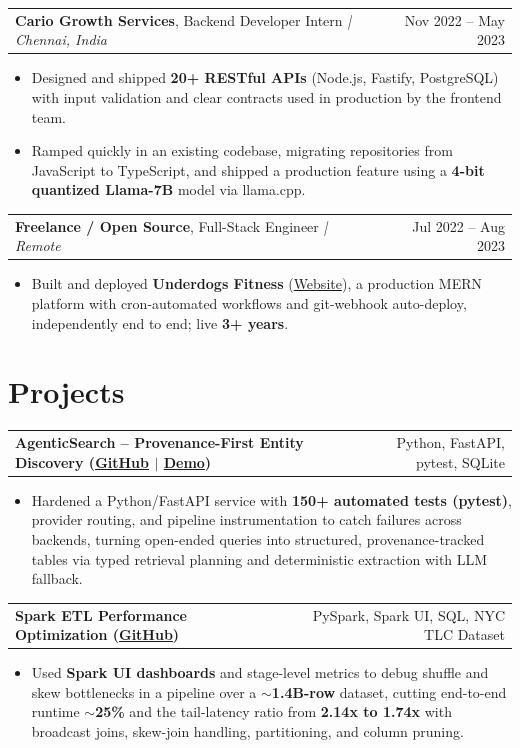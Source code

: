 \documentclass[letterpaper,11pt]{article}
\makeatletter
\newcommand{\expItem}[4]{%
  \vspace{3pt}
  \begin{tabular*}{\textwidth}{@{}l@{\extracolsep{\fill}}r@{}}
    \textbf{#1}, #2 \textit{| #3} & #4 \\
  \end{tabular*}\par\vspace{-2pt}
}
\newcommand{\projItem}[2]{%
  \vspace{6pt}
  \begin{tabular*}{\textwidth}{@{}l@{\extracolsep{\fill}}r@{}}
    \textbf{#1} & #2 \\
  \end{tabular*}\par\vspace{-2pt}
}
\makeatother
\begin{document}
\expItem{Cario Growth Services}{Backend Developer Intern}{Chennai, India}{Nov 2022 -- May 2023}
\begin{itemize}
  \item Designed and shipped \textbf{20+ RESTful APIs} (Node.js, Fastify, PostgreSQL) with input validation and clear contracts used in production by the frontend team.
  \item Ramped quickly in an existing codebase, migrating repositories from JavaScript to TypeScript, and shipped a production feature using a \textbf{4-bit quantized Llama-7B} model via llama.cpp.
\end{itemize}

\expItem{Freelance / Open Source}{Full-Stack Engineer}{Remote}{Jul 2022 -- Aug 2023}
\begin{itemize}
  \item Built and deployed \textbf{Underdogs Fitness} (\href{https://www.underdogsfitness.in/}{Website}), a production MERN platform with cron-automated workflows and git-webhook auto-deploy, independently end to end; live \textbf{3+ years}.
\end{itemize}

\section{Projects}

\projItem{AgenticSearch -- Provenance-First Entity Discovery {\normalfont\small(\href{https://github.com/Deva-1903/ciir_agentic_search}{GitHub} $\vert$ \href{https://agentic-search-negglszkwa-uc.a.run.app}{Demo})}}{Python, FastAPI, pytest, SQLite}
\begin{itemize}
  \item Hardened a Python/FastAPI service with \textbf{150+ automated tests (pytest)}, provider routing, and pipeline instrumentation to catch failures across backends, turning open-ended queries into structured, provenance-tracked tables via typed retrieval planning and deterministic extraction with LLM fallback.
\end{itemize}

\projItem{Spark ETL Performance Optimization {\normalfont\small(\href{https://github.com/Deva-1903/Spark-ETL-Optimization}{GitHub})}}{PySpark, Spark UI, SQL, NYC TLC Dataset}
\begin{itemize}
  \item Used \textbf{Spark UI dashboards} and stage-level metrics to debug shuffle and skew bottlenecks in a pipeline over a \textbf{$\sim$1.4B-row} dataset, cutting end-to-end runtime \textbf{$\sim$25\%} and the tail-latency ratio from \textbf{2.14x to 1.74x} with broadcast joins, skew-join handling, partitioning, and column pruning.
\end{itemize}
\end{document}
